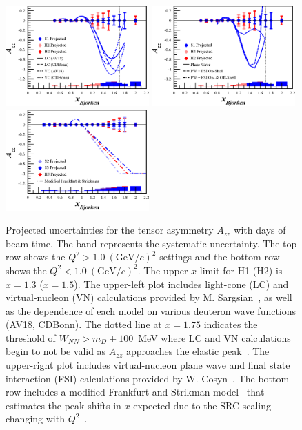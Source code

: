 \begin{figure}
\begin{center}
\includegraphics[width=0.49\textwidth]{figs/Azz_S1_H1_H2_vn_lc.eps} 
\includegraphics[width=0.49\textwidth]{figs/Azz_S1_H1_H2_fsi.eps} \\
\includegraphics[width=0.49\textwidth]{figs/Azz_S2_H3_S3.eps} 
\caption{\label{PROJ}Projected uncertainties for the tensor asymmetry $A_{zz}$ with \productiondays days of beam time. The band represents the systematic uncertainty. The top row shows the $Q^2>1.0~(\mathrm{GeV}/c)^2$ settings and the bottom row shows the $Q^2<1.0~(\mathrm{GeV}/c)^2$. The upper $x$ limit for H1 (H2) is $x=1.3$ ($x=1.5$). The upper-left plot includes light-cone (LC) and virtual-nucleon (VN) calculations provided by M. Sargsian~\cite{Sargsian:2014fla}, as well as the dependence of each model on various deuteron wave functions (AV18, CDBonn). The dotted line at $x=1.75$ indicates the threshold of $W_{NN}>m_D+100$~MeV where LC and VN calculations begin to not be valid as $A_{zz}$ approaches the elastic peak~\cite{Frankfurt:1993sp}. The upper-right plot includes virtual-nucleon plane wave and final state interaction (FSI) calculations provided by W. Cosyn~\cite{cosyn-convo}. The bottom row includes a modified Frankfurt and Strikman model~\cite{Frankfurt:1988nt} that estimates the peak shifts in $x$ expected due to the SRC scaling changing with $Q^2$~\cite{Frankfurt:2008zv}.
}
\end{center}
\end{figure}

